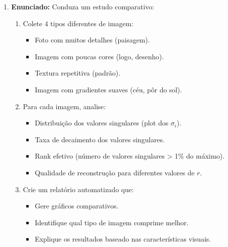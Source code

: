 \documentclass[a4paper,12pt]{article}
\begin{document}
\begin{enumerate}
    \item \textbf{Enunciado:}
    Conduza um estudo comparativo:
    \begin{enumerate}
        \item Colete 4 tipos diferentes de imagem:
        \begin{itemize}
            \item Foto com muitos detalhes (paisagem).
            \item Imagem com poucas cores (logo, desenho).
            \item Textura repetitiva (padrão).
            \item Imagem com gradientes suaves (céu, pôr do sol).
        \end{itemize}
        \item Para cada imagem, analise:
        \begin{itemize}
            \item Distribuição dos valores singulares (plot dos $\sigma_i$).
            \item Taxa de decaimento dos valores singulares.
            \item Rank efetivo (número de valores singulares > 1\% do máximo).
            \item Qualidade de reconstrução para diferentes valores de $r$.
        \end{itemize}
        \item Crie um relatório automatizado que:
        \begin{itemize}
            \item Gere gráficos comparativos.
            \item Identifique qual tipo de imagem comprime melhor.
            \item Explique os resultados baseado nas características visuais.
        \end{itemize}
    \end{enumerate}


\end{enumerate}
\end{document}

